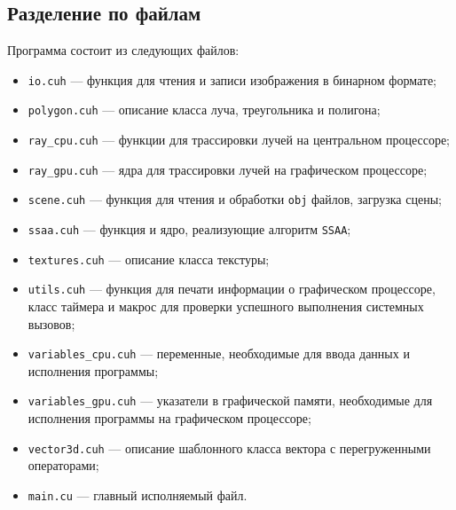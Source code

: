 \subsection{Разделение по файлам}
Программа состоит из следующих файлов:
\begin{itemize}
    \item \texttt{io.cuh} --- функция для чтения и записи изображения в бинарном формате;
    \item \texttt{polygon.cuh} --- описание класса луча, треугольника и полигона;
    \item \texttt{ray\_cpu.cuh} --- функции для трассировки лучей на центральном процессоре;
    \item \texttt{ray\_gpu.cuh} --- ядра для трассировки лучей на графическом процессоре;
    \item \texttt{scene.cuh} --- функция для чтения и обработки \texttt{obj} файлов, загрузка сцены;
    \item \texttt{ssaa.cuh} --- функция и ядро, реализующие алгоритм
    \texttt{SSAA};
    \item \texttt{textures.cuh} --- описание класса текстуры;
    \item \texttt{utils.cuh} --- функция для печати информации о графическом процессоре, класс таймера и макрос для проверки успешного выполнения системных вызовов;
    \item \texttt{variables\_cpu.cuh} --- переменные, необходимые для ввода данных и исполнения программы;
    \item \texttt{variables\_gpu.cuh} --- указатели в графической памяти, необходимые для исполнения программы на графическом процессоре;
    \item \texttt{vector3d.cuh} --- описание шаблонного класса вектора с перегруженными операторами;
    \item \texttt{main.cu} --- главный исполняемый файл.
\end{itemize}


\pagebreak
